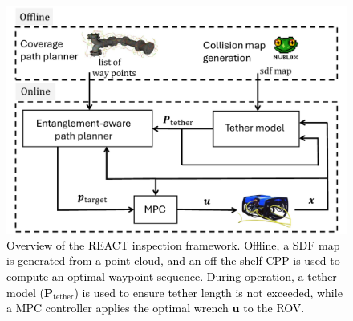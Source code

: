 %
\begin{figure}[t!]
	\centering	\includegraphics[width=1\linewidth]{EA-Planner/figures/abstract.pdf}
	  \caption{\textcolor{black}{Overview of the \ac{REACT} inspection framework. Offline, a \ac{SDF} map is generated from a point cloud, and an off-the-shelf \ac{CPP} \cite{feng2024fc} is used to compute an optimal waypoint sequence. During operation, a tether model (\(\mathbf{P}_{\text{tether}}\)) is used  to ensure tether length is not exceeded, while a \ac{MPC} controller applies the optimal wrench $\mathbf{u}$ to the \ac{ROV}}.}
    \label{fig:abstract}
\end{figure}
%


